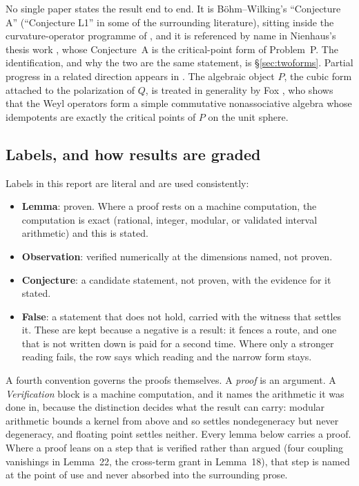 No single paper states the result end to end. It is B\"ohm--Wilking's ``Conjecture A'' (``Conjecture L1'' in some of the surrounding literature), sitting inside the curvature-operator programme of \cite{bw2008}, and it is referenced by name in Nienhaus's thesis work \cite{nienhaus2023}, whose Conjecture~A is the critical-point form of Problem~P. The identification, and why the two are the same statement, is \S\ref{sec:twoforms}. Partial progress in a related direction appears in \cite{xu2024}. The algebraic object $P$, the cubic form attached to the polarization of $Q$, is treated in generality by Fox \cite{fox2019}, who shows that the Weyl operators form a simple commutative nonassociative algebra whose idempotents are exactly the critical points of $P$ on the unit sphere.

\subsection{Labels, and how results are graded}\label{sec:labels}

Labels in this report are literal and are used consistently:
\begin{itemize}[nosep,leftmargin=1.4em]
\item \textbf{Lemma}: proven. Where a proof rests on a machine computation, the computation is exact (rational, integer, modular, or validated interval arithmetic) and this is stated.
\item \textbf{Observation}: verified numerically at the dimensions named, not proven.
\item \textbf{Conjecture}: a candidate statement, not proven, with the evidence for it stated.
\item \textbf{False}: a statement that does not hold, carried with the witness that settles it. These are kept because a negative is a result: it fences a route, and one that is not written down is paid for a second time. Where only a stronger reading fails, the row says which reading and the narrow form stays.
\end{itemize}

A fourth convention governs the proofs themselves. A \emph{proof} is an argument. A \emph{Verification} block is a machine computation, and it names the arithmetic it was done in, because the distinction decides what the result can carry: modular arithmetic bounds a kernel from above and so settles nondegeneracy but never degeneracy, and floating point settles neither. Every lemma below carries a proof. Where a proof leans on a step that is verified rather than argued (four coupling vanishings in Lemma~22, the cross-term grant in Lemma~18), that step is named at the point of use and never absorbed into the surrounding prose.

